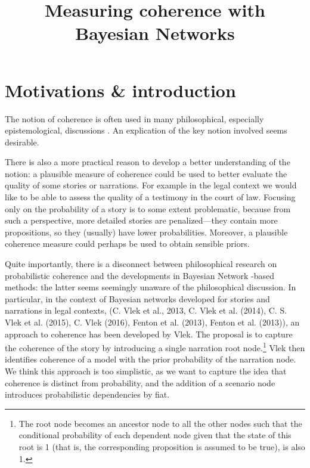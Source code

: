 \documentclass[10pt,]{scrartcl}
\title{Measuring coherence with Bayesian Networks}
\author{}
\date{\vspace{-2.5em}}
\begin{document}
\maketitle

\section{Motivations \& introduction}

The notion of coherence is often used in many philosophical, especially
epistemological, discussions \citep[for instance, in discussions about the
truth-conduciveness of coherence]{shogenji1999conducive}. An explication of the key notion
involved seems desirable.

There is also a more practical reason to develop a better understanding
of the notion: a plausible measure of coherence could be used to better
evaluate the quality of some stories or narrations. For example in the
legal context we would like to be able to assess the quality of a
testimony in the court of law. Focusing only on the probability of a
story is to some extent problematic, because from such a perspective,
more detailed stories are penalized---they contain more propositions,
so they (usually) have lower probabilities.  Moreover, a plausible coherence
measure could perhaps be used to obtain sensible priors.

Quite importantly, there is a disconnect between philosophical research on probabilistic coherence and the developments in Bayesian Network -based methods: the latter seems  seemingly unaware of the philosophical discussion. In particular, in the context of Bayesian networks developed
for stories and narrations in legal contexts,  (C. Vlek et al., 2013, C.
Vlek et al. (2014), C. S. Vlek et al. (2015), C. Vlek (2016), Fenton et
al. (2013), Fenton et al. (2013)), an approach to coherence has been
developed by Vlek. The proposal is to capture the coherence of the story
by introducing a single narration root node.\footnote{The root node  becomes an ancestor
node to all the other nodes such that the conditional probability of
each dependent node given that the state of this root is 1 (that is, the
corresponding proposition is assumed to be true), is also 1.}  Vlek then identifies
coherence of a model with the prior probability of the narration node. We think this approach is too simplistic, as we want to capture the idea that coherence is distinct
from probability, and  the addition of a scenario node  introduces probabilistic
dependencies by fiat. 
\end{document}
